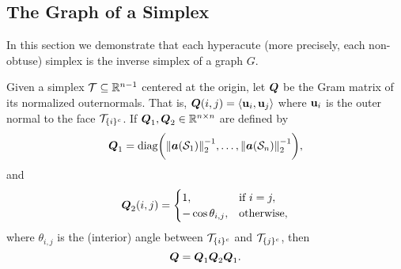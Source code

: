 \subsection{The Graph of a Simplex}
\label{sec:simplex_to_graph}
In this section we demonstrate that each hyperacute (more precisely, each non-obtuse) simplex is the inverse simplex of a graph $G$. 


\begin{lemma}
Given a simplex $\mathcal{T}\subseteq\mathbb{R}^{n-1}$ centered at the origin, let $\vb*{Q}$ be the Gram matrix of its normalized outernormals. That is, $\vb*{Q}(i,j)=\langle \vb{u}_i,\vb{u}_j\rangle$ where $\vb{u}_{i}$ is the outer normal to the face $\mathcal{T}_{\{i\}^c}$. If $\vb*{Q}_1,\vb*{Q}_2\in\mathbb{R}^{n\times n}$ are defined by 
\begin{equation*}
\vb*{Q}_1 = \text{diag}\bigg(\norm{\vb*{a}(\mathcal{S}_1)}_2^{-1},\dots,\norm{\vb*{a}(\mathcal{S}_n)}_2^{-1}\bigg),
\end{equation*}
and 
\begin{equation*}
\vb*{Q}_2(i,j) = \begin{cases}
1,& \text{if } i=j,\\
-\cos\theta_{i,j},&\text{otherwise},
\end{cases} 
\end{equation*}
where $\theta_{i,j}$ is the (interior) angle between $\mathcal{T}_{\{i\}^c}$ and $\mathcal{T}_{\{j\}^c}$, then 
\begin{equation*}
\vb*{Q} = \vb*{Q}_1 \vb*{Q}_2 \vb*{Q}_1.
\end{equation*}
\end{lemma}


